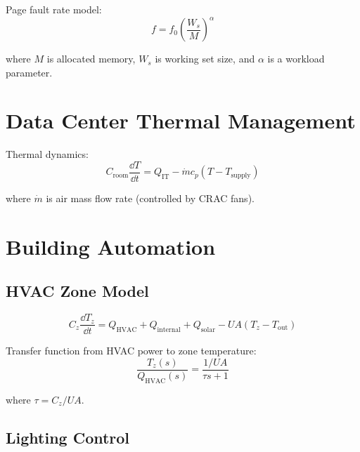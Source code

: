 Page fault rate model:
\begin{equation}
f = f_0 \left(\frac{W_s}{M}\right)^\alpha
\end{equation}

where $M$ is allocated memory, $W_s$ is working set size, and $\alpha$ is a workload parameter.

\section{Data Center Thermal Management}
\label{sec:datacenter}



Thermal dynamics:
\begin{equation}
C_{\text{room}}\frac{\dd T}{\dd t} = Q_{\text{IT}} - \dot{m}c_p(T - T_{\text{supply}})
\end{equation}

where $\dot{m}$ is air mass flow rate (controlled by CRAC fans).

\section{Building Automation}
\label{sec:building}

\subsection{HVAC Zone Model}

\begin{equation}
C_z\frac{\dd T_z}{\dd t} = Q_{\text{HVAC}} + Q_{\text{internal}} + Q_{\text{solar}} - UA(T_z - T_{\text{out}})
\end{equation}

Transfer function from HVAC power to zone temperature:
\begin{equation}
\frac{T_z(s)}{Q_{\text{HVAC}}(s)} = \frac{1/UA}{\tau s + 1}
\end{equation}

where $\tau = C_z/UA$.

\subsection{Lighting Control}

